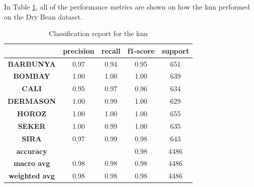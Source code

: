 \documentclass[10pt, conference]{IEEEtran}
\begin{document}
In Table \ref{tab:knn_cfr}, all of the performance metrics are shown on how the \acrshort{knn}
performed on the Dry Bean dataset.
\begin{table}[H]
    \caption{Classification report for the \acrshort{knn}}
    \begin{center}
        \begin{tabular}{|c||c|c|c|c|}
            \hline
                        & \textbf{precision} & \textbf{recall} & \textbf{f1-score} & \textbf{support} \\
            \hline
            \textbf{BARBUNYA}  &  0.97  &    0.94   &   0.95   &    651\\
            \textbf{BOMBAY}  & 1.00   &   1.00   &   1.00   &    639\\
            \textbf{CALI} & 0.95   &   0.97   &   0.96   &    634\\
            \textbf{DERMASON} & 1.00   &   0.99  &    1.00   &    629\\
            \textbf{HOROZ} &  1.00   &   1.00   &   1.00    &   655\\
            \textbf{SEKER} & 1.00  &    0.99   &   1.00    &   635\\
            \textbf{SIRA} &  0.97  &    0.99   &   0.98    &   643\\
            \textbf{accuracy} & & & 0.98   &   4486\\
            \textbf{macro avg} &0.98   &   0.98   &   0.98   &   4486\\
            \textbf{weighted avg} & 0.98    &  0.98  &    0.98   &   4486\\
            \hline
        \end{tabular}
    \end{center}
    \label{tab:knn_cfr}
\end{table}
\end{document}
